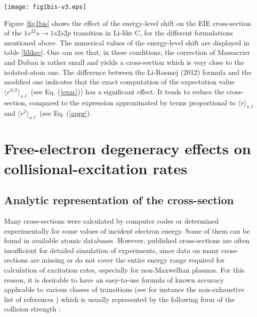 \documentclass[a4paper,10pt]{article}
\begin{document}
\begin{figure*}
\vspace{1cm}
\begin{center}
\texttt{[image: fig1bis-v3.eps]}
\end{center}
\caption{(Color online) Effect of different energy-level shifts on EIE cross-section in Li-like C ($1s^22s\rightarrow 1s2s2p$ transition): Massacrier-Dubau (Eq. (\ref{r2})), Li-Rosmej 2012 (Eq. (\ref{appr})), Li-Rosmej 2012 modified (Eq. (\ref{exac})), Li \textit{et al.} modified (Eq. (\ref{li1924})).}\label{fig1bis}
\vspace{1cm}
\end{figure*}

\noindent Figure \ref{fig1bis} shows the effect of the energy-level shift on the EIE cross-section of the $1s^22s\rightarrow 1s2s2p$ transition in Li-like C, for the different formulations mentioned above. The numerical values of the energy-level shift are displayed in table \ref{lilikec}. One can see that, in these conditions, the correction of Massacrier and Dubau is rather small and yields a cross-section which is very close to the isolated-atom one. The difference between the Li-Rosmej (2012) formula and the modified one indicates that the exact computation of the expectation value $\langle r^{3/2}\rangle_{n\ell}$ (see Eq. (\ref{exac})) has a significant effect. It tends to reduce the cross-section, compared to the expression approximated by terms proportional to $\langle r\rangle_{n\ell}$ and $\langle r^2\rangle_{n\ell}$ (see Eq. (\ref{appr}). 

\section{Free-electron degeneracy effects on collisional-excitation rates}\label{sec5}

\subsection{Analytic representation of the cross-section}\label{subsec51}

Many cross-sections were calculated by computer codes or determined experimentally for some values of incident electron energy. Some of them can be found in available atomic databases. However, published cross-sections are often insufficient for detailed simulation of experiments, since data on many cross-sections are missing or do not cover the entire energy range required for calculation of excitation rates, especially for non-Maxwellian plasmas. For this reason, it is desirable to have an easy-to-use formula of known accuracy applicable to various classes of transitions (see for instance the non-exhaustive list of references \cite{VANREGEMORTER62,GOETT80,BUSQUET07,FONTES15}) which is usually represented by the following form of the collision strength \cite{SUNA06}:
\end{document}
